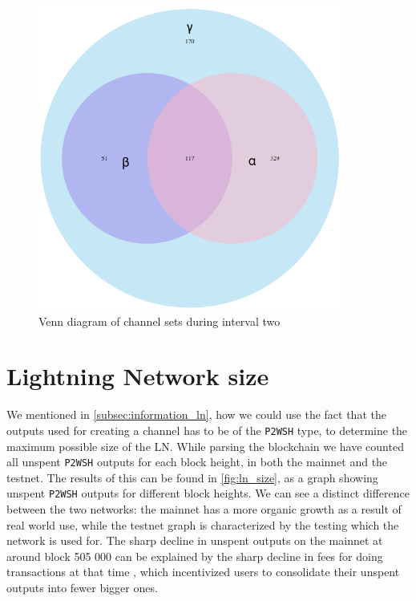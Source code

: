 \begin{figure}[ht]
    \centering
    \includegraphics[width=10cm]{figures/graphs/venn_run2.png}
    \caption{Venn diagram of channel sets during interval two}
    \label{fig:venn_run2}
\end{figure}

\section{Lightning Network size}

We mentioned in \cref{subsec:information_ln}, how we could use the fact that the outputs used for creating a channel has to be of the {\tt P2WSH} type, to determine the maximum possible size of the LN.
While parsing the blockchain we have counted all unspent {\tt P2WSH} outputs for each block height, in both the mainnet and the testnet.
The results of this can be found in \cref{fig:ln_size}, as a graph showing unspent {\tt P2WSH} outputs for different block heights.
We can see a distinct difference between the two networks: the mainnet has a more organic growth as a result of real world use, while the testnet graph is characterized by the testing which the network is used for. The sharp decline in unspent outputs on the mainnet at around block 505 000 can be explained by the sharp decline in fees for doing transactions at that time \cite{mempool_stats}, which incentivized users to consolidate their unspent outputs into fewer bigger ones. 

